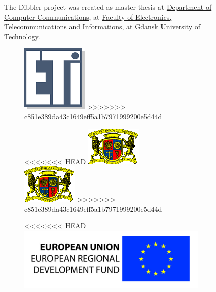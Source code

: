 \begin{figure}[ht]
\begin{minipage}[b]{0.33\linewidth}
\vspace{1cm}

\noindent
The Dibbler project was created as master thesis at 
\href{http://www.eti.pg.gda.pl/lang?locale=en/}{Department
of Computer Communications}, at \href{http://www.eti.pg.gda.pl/lang?locale=en}{Faculty of Electronics,
Telecommunications and Informations}, at \href{http://www.pg.gda.pl/en/}{Gdansk University of Technology}.

\begin{figure}[ht]
\begin{minipage}[b]{0.33\linewidth}
\centering
\includegraphics[scale=1.0]{logo-eti}
>>>>>>> c851e389da43c1649eff5a1b7971999200e5d44d
\vspace{-0.8cm}
\end{minipage}
\begin{minipage}[b]{0.33\linewidth}
\centering
<<<<<<< HEAD
\includegraphics[scale=0.7]{logo-pg}
=======
\includegraphics[scale=1.1]{logo-pg}
>>>>>>> c851e389da43c1649eff5a1b7971999200e5d44d
\end{minipage}
\hspace{0.5cm}
\begin{minipage}[b]{0.33\linewidth}
\centering
<<<<<<< HEAD
\includegraphics[scale=0.8]{logo-eu}
\end{minipage}

\end{figure}
\end{minipage}
\end{figure}
